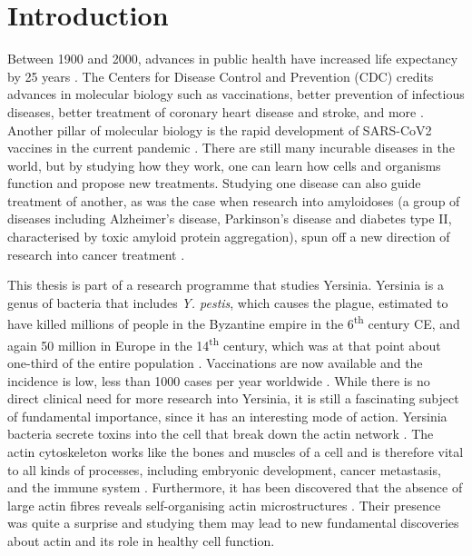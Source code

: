 \chapter{Introduction}
Between 1900 and 2000, advances in public health have increased life expectancy by 25 years \cite{Bunker1994}. The Centers for Disease Control and Prevention (CDC) credits advances in molecular biology such as vaccinations, better prevention of infectious diseases, better treatment of coronary heart disease and stroke, and more \cite{CDC1999}. Another pillar of molecular biology is the rapid development of SARS-CoV2 vaccines in the current pandemic \cite{Sadoff2021, Polack2020}. There are still many incurable diseases in the world, but by studying how they work, one can learn how cells and organisms function and propose new treatments. Studying one disease can also guide treatment of another, as was the case when research into amyloidoses (a group of diseases including Alzheimer's disease, Parkinson's disease and diabetes type II, characterised by toxic amyloid protein aggregation), spun off a new direction of research into cancer treatment \cite{Gallardo2016}.

This thesis is part of a research programme that studies Yersinia. Yersinia is a genus of bacteria that includes \emph{Y. pestis}, which causes the plague, estimated to have killed millions of people in the Byzantine empire in the 6\textsuperscript{th} century CE, and again 50 million in Europe in the 14\textsuperscript{th} century, which was at that point about one-third of the entire population \cite{Zietz2004}. Vaccinations are now available and the incidence is low, less than 1000 cases per year worldwide \cite{WHO2014}. 
While there is no direct clinical need for more research into Yersinia, it is still a fascinating subject of fundamental importance, since it has an interesting mode of action. Yersinia bacteria secrete toxins into the cell that break down the actin network \cite{Ono2017}. The actin cytoskeleton works like the bones and muscles of a cell and is therefore vital to all kinds of processes, including embryonic development, cancer metastasis, and the immune system \cite{molbio, Horwitz2003, Umeda2016, Barnat2017, Lin2017}. Furthermore, it has been discovered that the absence of large actin fibres reveals self-organising actin microstructures \cite{Fritzsche2017a}. Their presence was quite a surprise and studying them may lead to new fundamental discoveries about actin and its role in healthy cell function.

